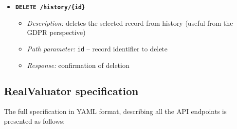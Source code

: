 \documentclass{article}
\begin{document}
\begin{itemize}
\item \textbf{\texttt{DELETE /history/\{id\}}}
\begin{itemize}
\item \emph{Description:} deletes the selected record from history (useful from the GDPR perspective)
\item \emph{Path parameter:} \texttt{id} – record identifier to delete
\item \emph{Response:} confirmation of deletion
\end{itemize}
\end{itemize}


\subsection{RealValuator specification}

The full specification in YAML format, describing all the API endpoints is presented as follows:
\end{document}
